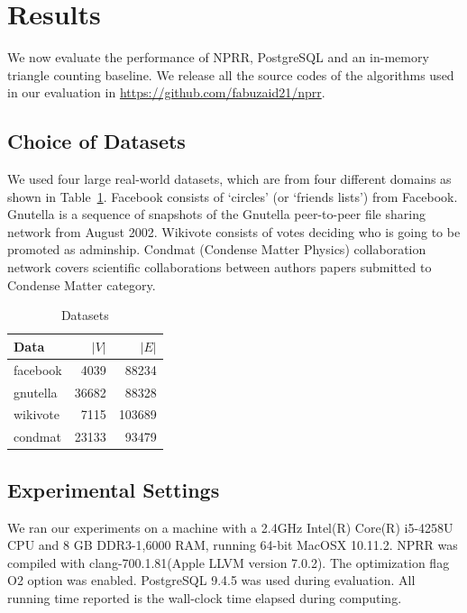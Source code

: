 \section{Results}

We now evaluate the performance of NPRR, PostgreSQL and an in-memory triangle counting baseline. We release all the source codes of the algorithms used in our evaluation in \url{https://github.com/fabuzaid21/nprr}.


\subsection{Choice of Datasets} 

We used four large real-world datasets, which are from four different domains as shown in Table~\ref{datasets}. Facebook consists of `circles' (or `friends lists') from Facebook. Gnutella is a sequence of snapshots of the Gnutella peer-to-peer file sharing network from August 2002. Wikivote consists of votes deciding who is going to  be promoted as adminship. Condmat (Condense Matter Physics) collaboration network covers scientific collaborations between authors papers submitted to Condense Matter category. 


\begin{table}[!h]
\centering

\begin{tabular}{l|r|r}
Data & $|V|$ & $|E|$ \\
\hline
facebook & 4039 & 88234  \\
\hline
gnutella & 36682 & 88328 \\
\hline
wikivote & 7115 & 103689 \\
\hline
condmat & 23133 & 93479 \\
\hline
\end{tabular}
\caption{Datasets}
\label{datasets}
\end{table}



\subsection{Experimental Settings} 

We ran our experiments on a machine with a 2.4GHz Intel(R) Core(R) i5-4258U CPU and 8 GB DDR3-1,6000 RAM, running 64-bit MacOSX 10.11.2. NPRR was compiled with clang-700.1.81(Apple LLVM version 7.0.2). The optimization flag O2 option was enabled. PostgreSQL 9.4.5 was used during evaluation. All running time reported is the wall-clock time elapsed during computing.


